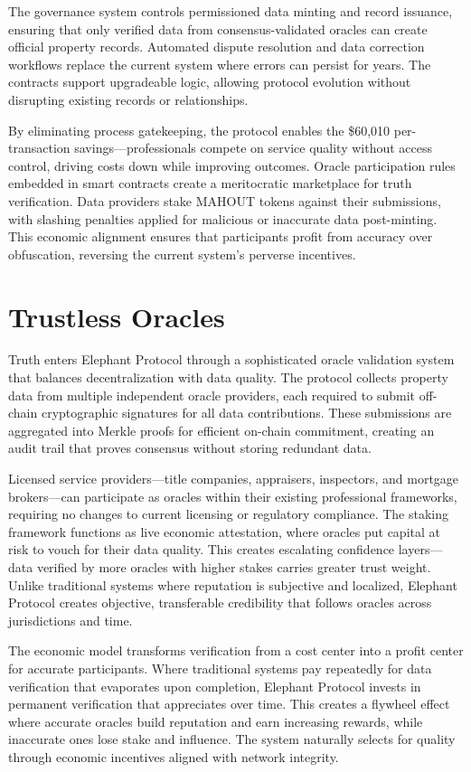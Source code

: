 The governance system controls permissioned data minting and record issuance, ensuring that only verified data from consensus-validated oracles can create official property records. Automated dispute resolution and data correction workflows replace the current system where errors can persist for years. The contracts support upgradeable logic, allowing protocol evolution without disrupting existing records or relationships.

By eliminating process gatekeeping, the protocol enables the \$60,010 per-transaction savings---professionals compete on service quality without access control, driving costs down while improving outcomes. Oracle participation rules embedded in smart contracts create a meritocratic marketplace for truth verification. Data providers stake MAHOUT tokens against their submissions, with slashing penalties applied for malicious or inaccurate data post-minting. This economic alignment ensures that participants profit from accuracy over obfuscation, reversing the current system's perverse incentives.

\section{Trustless Oracles}

Truth enters Elephant Protocol through a sophisticated oracle validation system that balances decentralization with data quality. The protocol collects property data from multiple independent oracle providers, each required to submit off-chain cryptographic signatures for all data contributions. These submissions are aggregated into Merkle proofs for efficient on-chain commitment, creating an audit trail that proves consensus without storing redundant data.

Licensed service providers---title companies, appraisers, inspectors, and mortgage brokers---can participate as oracles within their existing professional frameworks, requiring no changes to current licensing or regulatory compliance. The staking framework functions as live economic attestation, where oracles put capital at risk to vouch for their data quality. This creates escalating confidence layers---data verified by more oracles with higher stakes carries greater trust weight. Unlike traditional systems where reputation is subjective and localized, Elephant Protocol creates objective, transferable credibility that follows oracles across jurisdictions and time.

The economic model transforms verification from a cost center into a profit center for accurate participants. Where traditional systems pay repeatedly for data verification that evaporates upon completion, Elephant Protocol invests in permanent verification that appreciates over time. This creates a flywheel effect where accurate oracles build reputation and earn increasing rewards, while inaccurate ones lose stake and influence. The system naturally selects for quality through economic incentives aligned with network integrity.

